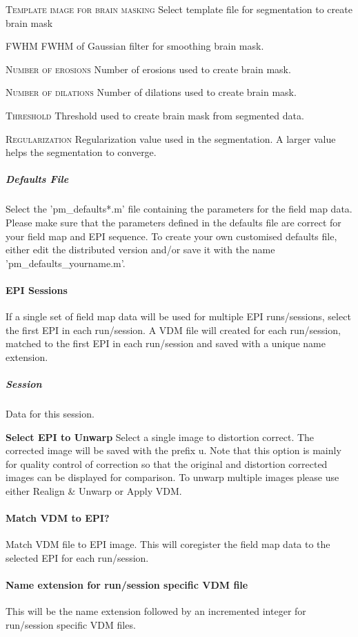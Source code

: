 \textsc{Template image for brain masking}
Select template file for segmentation to create brain mask


\textsc{FWHM}
FWHM of Gaussian filter for smoothing brain mask.


\textsc{Number of erosions}
Number of erosions used to create brain mask.


\textsc{Number of dilations}
Number of dilations used to create brain mask.


\textsc{Threshold}
Threshold used to create brain mask from segmented data.


\textsc{Regularization}
Regularization value used in the segmentation. A larger value helps the segmentation to converge.


\subparagraph{Defaults File}
Select the 'pm\_defaults*.m' file containing the parameters for the field map data. Please make sure that the parameters defined in the defaults file are correct for your field map and EPI sequence. To create your own customised defaults file, either edit the distributed version and/or save it with the name 'pm\_defaults\_yourname.m'.


\paragraph{EPI Sessions}
If a single set of field map data will be used for multiple EPI runs/sessions, select the first EPI in each run/session. A VDM file will created for each run/session, matched to the first EPI in each run/session and saved with a unique name extension.


\subparagraph{Session}
Data for this session.


\textbf{Select EPI to Unwarp}
Select a single image to distortion correct. The corrected image will be saved with the prefix u. Note that this option is mainly for quality control of correction so that the original and distortion corrected images can be displayed for comparison. To unwarp multiple images please use either Realign \& Unwarp or Apply VDM.


\paragraph{Match VDM to EPI?}
Match VDM file to EPI image. This will coregister the field map data to the selected EPI for each run/session.


\paragraph{Name extension for run/session specific VDM file}
This will be the name extension followed by an incremented integer for run/session specific VDM files.


